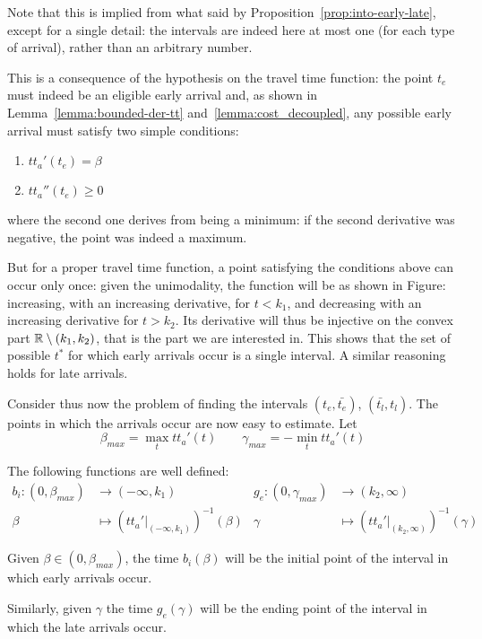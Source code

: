 Note that this is implied from what said by Proposition~\ref{prop:into-early-late},
except for a single detail:
the intervals are indeed here at most one (for each type of arrival), rather than an arbitrary number.

This is a consequence of the hypothesis on the travel time function:
the point \(t_e\) must indeed be an eligible early arrival and,
as shown in Lemma~\ref{lemma:bounded-der-tt} and~\ref{lemma:cost_decoupled},
any possible early arrival must satisfy two simple conditions:
\begin{enumerate}
\item \(tt_a'(t_e) = \beta\)
\item \(tt_a''(t_e) \geq 0\)
\end{enumerate}
where the second one derives from being a minimum:
if the second derivative was negative, the point was indeed a maximum.

But for a proper travel time function,
a point satisfying the conditions above can occur only once:
given the unimodality,
the function will be as shown in Figure: increasing, with an increasing derivative,
for \(t < k_1\), and decreasing with an increasing derivative for \(t > k_2\).
Its derivative will thus be injective on the convex part \(\mathbb{R} \setminus (k_1, k_2)\),
that is the part we are interested in.
This shows that the set of possible \(t^*\) for which early arrivals occur is a single interval.
A similar reasoning holds for late arrivals.

Consider thus now the problem of finding the intervals \((t_e, \bar{t_e})\), \((\bar{t_l}, t_l)\).
The points in which the arrivals occur are now easy to estimate. Let
\begin{equation*}
  \beta_{max} = \max_t tt_a'(t)\qquad \gamma_{max} = -\min_t tt_a'(t)
\end{equation*}

The following functions are well defined:
\begin{align*}
  b_i: (0, \beta_{max}) & \rightarrow (-\infty, k_1)  & g_e: (0, \gamma_{max}) & \rightarrow (k_2, \infty) \\
       \beta & \mapsto (tt_a' |_{(-\infty, k_1)})^{-1}(\beta) & \gamma & \mapsto(tt_a' |_{(k_2, \infty)})^{-1}(\gamma)
\end{align*}

Given \(\beta \in (0, \beta_{max})\),
the time \(b_i(\beta)\) will be the initial point of the interval in which early arrivals occur.

Similarly, given \(\gamma\) the time \(g_e(\gamma)\) will be the ending point of the interval in which the late arrivals occur.


